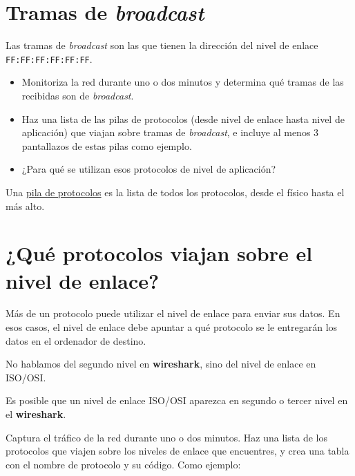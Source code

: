 \documentclass[a4paper]{article}
\begin{document}
\clearpage

\section{Tramas de \emph{broadcast}}
\label{sec:org0000003}

Las tramas de \emph{broadcast} son las que tienen la dirección del nivel de enlace \texttt{FF:FF:FF:FF:FF:FF}.

\begin{itemize}
\item Monitoriza la red durante uno o dos minutos y determina qué tramas de las recibidas son de \emph{broadcast}.
\item Haz una lista de las pilas de protocolos (desde nivel de enlace hasta nivel de aplicación) que viajan sobre tramas de \emph{broadcast}, e incluye al menos 3 pantallazos de estas pilas como ejemplo.
\item ¿Para qué se utilizan esos protocolos de nivel de aplicación?
\end{itemize}

\begin{adjustwidth}{2cm}{2cm}
\begin{Aviso}
Una \href{https://en.wikipedia.org/wiki/Protocol\_stack}{pila de protocolos} es la lista de todos los protocolos, desde el físico hasta el más alto.
\end{Aviso}
\end{adjustwidth}




\section{¿Qué protocolos viajan sobre el nivel de enlace?}
\label{sec:org0000006}
Más de un protocolo puede utilizar el nivel de enlace para enviar sus datos. En esos casos, el nivel de enlace debe apuntar a qué protocolo se le entregarán los datos en el ordenador de destino.
\begin{adjustwidth}{2cm}{2cm}
\begin{Aviso}
No hablamos del segundo nivel en \textbf{wireshark}, sino del nivel de enlace en ISO/OSI.

Es posible que un nivel de enlace ISO/OSI aparezca en segundo o tercer nivel en el \textbf{wireshark}.
\end{Aviso}
\end{adjustwidth}

Captura el tráfico de la red durante uno o dos minutos. Haz una lista de los protocolos que viajen sobre los niveles de enlace que encuentres, y crea una tabla con el nombre de protocolo y su código. Como ejemplo:
\end{document}
